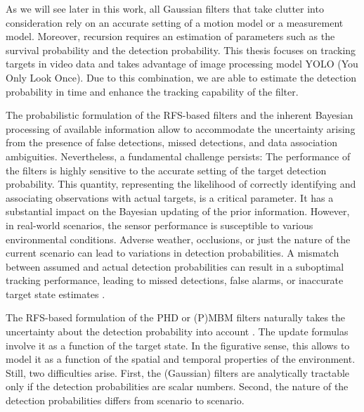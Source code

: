 As we will see later in this work, all Gaussian filters that take clutter into consideration rely on an accurate
setting
of a motion model or a measurement model. Moreover, recursion requires an estimation of parameters such as
the survival probability and the detection probability. This thesis focuses on tracking targets in video
data and takes advantage of image processing model YOLO (You Only Look Once). Due to this combination, we are able to
estimate the detection probability in time and enhance the tracking capability of the filter.

The probabilistic formulation of the RFS-based filters and the inherent Bayesian processing of available information allow to accommodate the uncertainty arising from the presence of false detections, missed detections, and data association ambiguities. Nevertheless, a fundamental challenge persists: The performance of the filters is highly sensitive to the accurate setting of the target detection probability. This quantity, representing the likelihood of correctly identifying and associating observations with actual targets, is a critical parameter. It has a substantial impact on the Bayesian updating of the prior information.
However, in real-world scenarios, the sensor performance is susceptible to various environmental conditions. Adverse weather, occlusions, or just the nature of the current scenario can lead to variations in detection probabilities. A mismatch between assumed and actual detection probabilities can result in a suboptimal tracking performance, leading to missed detections, false alarms, or inaccurate target state estimates \cite{Hendeby2014Gaussian}.

The RFS-based formulation of the PHD or (P)MBM filters naturally takes the uncertainty about the detection
probability into account \cite{Hendeby2014Gaussian}. The update formulas involve it as a function of the target state. In the figurative sense, this allows to model it as a function of the spatial and temporal properties of the environment.
Still, two difficulties arise. First, the (Gaussian) filters are analytically tractable only if the detection probabilities are scalar numbers. Second, the nature of the detection probabilities differs from scenario to scenario.

